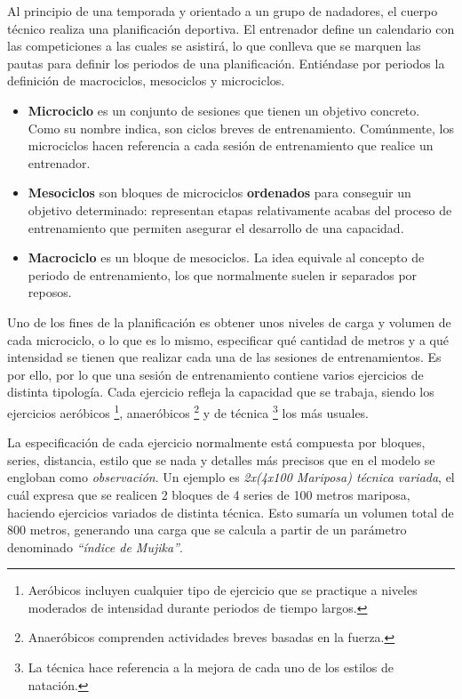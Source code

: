 	Al principio de una temporada y orientado a un grupo de nadadores, el cuerpo técnico realiza una planificación deportiva. El entrenador define un calendario con las competiciones a las cuales se asistirá, lo que conlleva que se marquen las pautas para definir los periodos de una planificación. Entiéndase por periodos la definición de macrociclos, mesociclos y microciclos.
	
	\begin{itemize}
		\item{{\bf Microciclo} es un conjunto de sesiones que tienen un objetivo concreto. Como su nombre indica, son ciclos breves de entrenamiento. Comúnmente, los microciclos hacen referencia a cada sesión de entrenamiento que realice un entrenador.}
		\item{{\bf Mesociclos} son bloques de microciclos {\bf ordenados} para conseguir un objetivo determinado: representan etapas relativamente acabas del proceso de entrenamiento que permiten asegurar el desarrollo de una capacidad.}
		\item{{\bf Macrociclo} es un bloque de mesociclos. La idea equivale al concepto de periodo de entrenamiento, los que normalmente suelen ir separados por reposos. } 
	\end{itemize}
	
	Uno de los fines de la planificación es obtener unos niveles de carga y volumen de cada microciclo, o lo que es lo mismo, especificar qué cantidad de metros y a qué intensidad se tienen que realizar cada una de las sesiones de entrenamientos. Es por ello, por lo que una sesión de entrenamiento contiene varios ejercicios de distinta tipología. Cada ejercicio refleja la capacidad que se trabaja, siendo los ejercicios aeróbicos \footnote{Aeróbicos incluyen cualquier tipo de ejercicio que se practique a niveles moderados de intensidad durante periodos de tiempo largos.}, anaeróbicos \footnote{Anaeróbicos comprenden actividades breves basadas en la fuerza.} y de técnica \footnote{La técnica hace referencia a la mejora de cada uno de los estilos de natación.} los más usuales.
	
	La especificación de cada ejercicio normalmente está compuesta por bloques, series, distancia, estilo que se nada y detalles más precisos que en el modelo se engloban como {\it observación}. Un ejemplo es {\it 2x(4x100 Mariposa) técnica variada}, el cuál expresa que se realicen 2 bloques de 4 series de 100 metros mariposa, haciendo ejercicios variados de distinta técnica. Esto sumaría un volumen total de 800 metros, generando una carga que se calcula a partir de un parámetro denominado {\it ``índice de Mujika''}.
	
